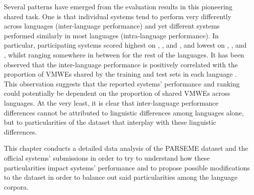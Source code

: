 \documentclass[output=paper,modfonts,nonflat,draftmode]{langsci/langscibook}
\begin{document}

Several patterns have emerged from the evaluation results in this pioneering shared task. One is that individual systems tend to perform very differently across languages (inter-language performance) and yet different systems performed similarly in most languages (intra-language performance). In particular, participating systems scored highest on , ,  and , and lowest on , ,  and , whilst ranging somewhere in between for the rest of the languages. It has been observed that the inter-language performance is positively correlated with the proportion of VMWEs shared by the training and test sets in each language \citep{maldonado2017}. This observation suggests that the reported systems' performance and ranking could potentially be dependent on the proportion of shared VMWEs across languages. At the very least, it is clear that inter-language performance differences cannot be attributed to linguistic differences among languages alone, but to particularities of the dataset that interplay with these linguistic differences.

This chapter conducts a detailed data analysis of the PARSEME dataset and the official systems' submissions in order to try to understand how these particularities impact systems' performance and to propose possible modifications to the dataset in order to balance out said particularities among the language corpora.
\end{document}

